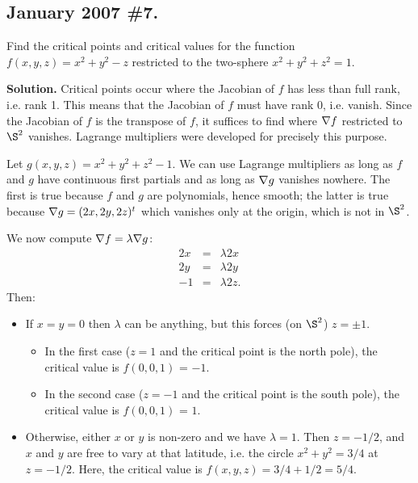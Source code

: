 \documentclass[10pt]{article}
\numberwithin{equation}{subsection}
\begin{document}
\subsection{January 2007 \#7.}

Find the critical points and critical values for the function $f(x,y,z) =
x^2+y^2-z$ restricted to the two-sphere $x^2+y^2+z^2=1$.

\textbf{Solution.}  Critical points occur where the Jacobian of $f$ has less
than full rank, i.e. rank 1.  This means that the Jacobian of $f$ must have
rank 0, i.e. vanish.  Since the Jacobian of $f$ is the transpose of $f$, it
suffices to find where $\nabla f$ restricted to $\S^2$ vanishes.  Lagrange
multipliers were developed for precisely this purpose.

Let $g(x,y,z)=x^2+y^2+z^2-1$.  We can use Lagrange multipliers as long as $f$
and $g$ have continuous first partials and as long as $\nabla g$ vanishes
nowhere.  The first is true because $f$ and $g$ are polynomials, hence smooth;
the latter is true because $\nabla g = (2x,2y,2z)^t$ which vanishes only at the
origin, which is not in $\S^2$.

We now compute $\nabla f = \lambda \nabla g$:
\begin{eqnarray*}
	2x &=& \lambda 2x \\
	2y &=& \lambda 2y \\
	-1 &=& \lambda 2z.
\end{eqnarray*}
Then:
\begin{itemize}
\item If $x=y=0$ then $\lambda$ can be anything, but this forces (on $\S^2$)
$z= \pm 1$.
	\begin{itemize}
	\item In the first case ($z=1$ and the critical point is the north pole),
	the critical value is $f(0,0,1)$ = $-1$.
	\item In the second case ($z=-1$ and the critical point is the south pole),
	the critical value is $f(0,0,1)$ = $1$.
	\end{itemize}

\item Otherwise, either $x$ or $y$ is non-zero and we have $\lambda=1$.  Then
$z=-1/2$, and $x$ and $y$ are free to vary at that latitude, i.e. the circle
$x^2+y^2=3/4$ at $z=-1/2$.  Here, the critical value is $f(x,y,z)=
3/4+1/2=5/4$.
\end{itemize}

%
\end{document}
